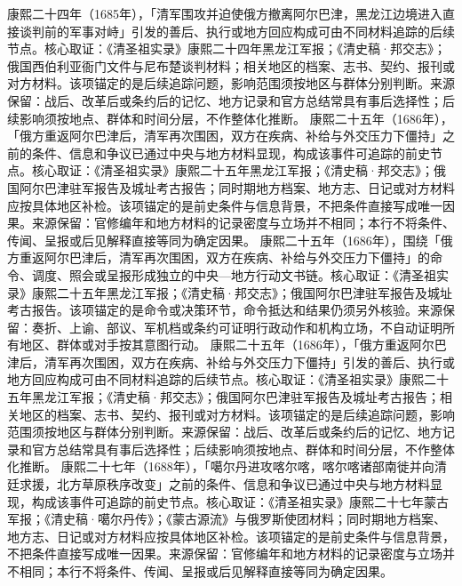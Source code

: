康熙二十四年（1685年），「清军围攻并迫使俄方撤离阿尔巴津，黑龙江边境进入直接谈判前的军事对峙」引发的善后、执行或地方回应构成可由不同材料追踪的后续节点。核心取证：《清圣祖实录》康熙二十四年黑龙江军报；《清史稿·邦交志》；俄国西伯利亚衙门文件与尼布楚谈判材料；相关地区的档案、志书、契约、报刊或对方材料。该项锚定的是后续追踪问题，影响范围须按地区与群体分别判断。来源保留：战后、改革后或条约后的记忆、地方记录和官方总结常具有事后选择性；后续影响须按地点、群体和时间分层，不作整体化推断。
康熙二十五年（1686年），「俄方重返阿尔巴津后，清军再次围困，双方在疾病、补给与外交压力下僵持」之前的条件、信息和争议已通过中央与地方材料显现，构成该事件可追踪的前史节点。核心取证：《清圣祖实录》康熙二十五年黑龙江军报；《清史稿·邦交志》；俄国阿尔巴津驻军报告及城址考古报告；同时期地方档案、地方志、日记或对方材料应按具体地区补检。该项锚定的是前史条件与信息背景，不把条件直接写成唯一因果。来源保留：官修编年和地方材料的记录密度与立场并不相同；本行不将条件、传闻、呈报或后见解释直接等同为确定因果。
康熙二十五年（1686年），围绕「俄方重返阿尔巴津后，清军再次围困，双方在疾病、补给与外交压力下僵持」的命令、调度、照会或呈报形成独立的中央—地方行动文书链。核心取证：《清圣祖实录》康熙二十五年黑龙江军报；《清史稿·邦交志》；俄国阿尔巴津驻军报告及城址考古报告。该项锚定的是命令或决策环节，命令抵达和结果仍须另外核验。来源保留：奏折、上谕、部议、军机档或条约可证明行政动作和机构立场，不自动证明所有地区、群体或对手按其意图行动。
康熙二十五年（1686年），「俄方重返阿尔巴津后，清军再次围困，双方在疾病、补给与外交压力下僵持」引发的善后、执行或地方回应构成可由不同材料追踪的后续节点。核心取证：《清圣祖实录》康熙二十五年黑龙江军报；《清史稿·邦交志》；俄国阿尔巴津驻军报告及城址考古报告；相关地区的档案、志书、契约、报刊或对方材料。该项锚定的是后续追踪问题，影响范围须按地区与群体分别判断。来源保留：战后、改革后或条约后的记忆、地方记录和官方总结常具有事后选择性；后续影响须按地点、群体和时间分层，不作整体化推断。
康熙二十七年（1688年），「噶尔丹进攻喀尔喀，喀尔喀诸部南徙并向清廷求援，北方草原秩序改变」之前的条件、信息和争议已通过中央与地方材料显现，构成该事件可追踪的前史节点。核心取证：《清圣祖实录》康熙二十七年蒙古军报；《清史稿·噶尔丹传》；《蒙古源流》与俄罗斯使团材料；同时期地方档案、地方志、日记或对方材料应按具体地区补检。该项锚定的是前史条件与信息背景，不把条件直接写成唯一因果。来源保留：官修编年和地方材料的记录密度与立场并不相同；本行不将条件、传闻、呈报或后见解释直接等同为确定因果。
